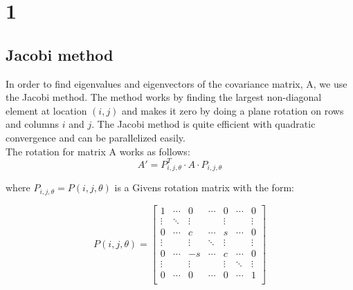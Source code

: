 \documentclass[12pt,twoside]{article}
\begin{document}
\section*{1}
\subsection*{Jacobi method}
In order to find eigenvalues and eigenvectors of the covariance matrix, A, we use the Jacobi method. The method works by finding the largest non-diagonal element at location $(i,j)$ and makes it zero by doing a plane rotation on rows and columns $i$ and $j$. The Jacobi method is quite efficient with quadratic convergence and can be parallelized easily.  \\


The rotation for matrix A works as follows:
\begin{equation}
     A' = P_{i,j,\theta}^T \cdot A \cdot P_{i,j,\theta}  
\end{equation}

where $P_{i,j,\theta} = P(i,j,\theta)$ is a Givens rotation matrix with the form:

\begin{equation}
P(i,j,\theta) = 
\begin{bmatrix}
     1 & \cdots & 0 & \cdots & 0 & \cdots & 0 \\
     \vdots & \ddots & \vdots &   & \vdots &  & \vdots \\
          0 & \cdots & c & \cdots & s & \cdots & 0 \\
         \vdots &  & \vdots & \ddots  & \vdots &  & \vdots \\
     0 & \cdots & -s & \cdots & c & \cdots & 0 \\
              \vdots &  & \vdots &  & \vdots & \ddots  & \vdots \\
                   0 & \cdots & 0 & \cdots & 0 & \cdots & 1 \\
\end{bmatrix}
\end{equation}\\
\end{document}
